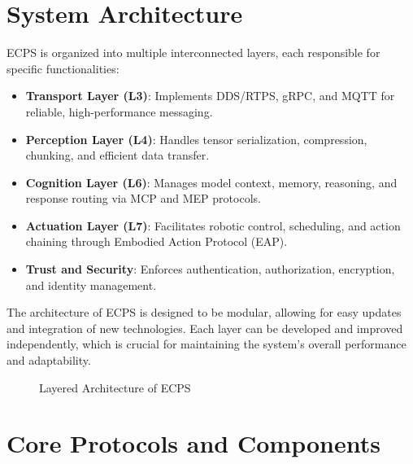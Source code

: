 \documentclass[12pt]{article}
\begin{document}
\section{System Architecture}
ECPS is organized into multiple interconnected layers, each responsible for specific functionalities:

\begin{itemize}
  \item \textbf{Transport Layer (L3)}: Implements DDS/RTPS, gRPC, and MQTT for reliable, high-performance messaging.
  \item \textbf{Perception Layer (L4)}: Handles tensor serialization, compression, chunking, and efficient data transfer.
  \item \textbf{Cognition Layer (L6)}: Manages model context, memory, reasoning, and response routing via MCP and MEP protocols.
  \item \textbf{Actuation Layer (L7)}: Facilitates robotic control, scheduling, and action chaining through Embodied Action Protocol (EAP).
  \item \textbf{Trust and Security}: Enforces authentication, authorization, encryption, and identity management.
\end{itemize}

The architecture of ECPS is designed to be modular, allowing for easy updates and integration of new technologies. Each layer can be developed and improved independently, which is crucial for maintaining the system's overall performance and adaptability.

\begin{figure}[H]
\centering
{}
\caption{Layered Architecture of ECPS}
\end{figure}

\section{Core Protocols and Components}
\end{document}
